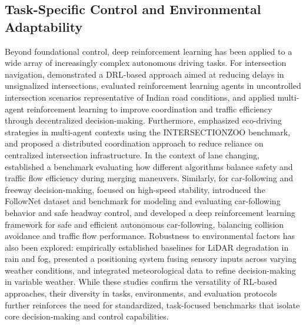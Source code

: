 \documentclass[sn-mathphys,Numbered]{sn-jnl}
\begin{document}
\subsection{Task-Specific Control and Environmental Adaptability}
Beyond foundational control, deep reinforcement learning has been applied to a wide array of increasingly complex autonomous driving tasks. For intersection navigation, \citet{benelallid2023intersection} demonstrated a DRL-based approach aimed at reducing delays in unsignalized intersections, \citet{shankar2025deep} evaluated reinforcement learning agents in uncontrolled intersection scenarios representative of Indian road conditions, and \citet{Spatharis02012024} applied multi-agent reinforcement learning to improve coordination and traffic efficiency through decentralized decision-making. Furthermore, \citet{jayawardana2023} emphasized eco-driving strategies in multi-agent contexts using the INTERSECTIONZOO benchmark, and \citet{cederle2024distributed} proposed a distributed coordination approach to reduce reliance on centralized intersection infrastructure. In the context of lane changing, \citet{wang2024benchmarking} established a benchmark evaluating how different algorithms balance safety and traffic flow efficiency during merging maneuvers. Similarly, for car-following and freeway decision-making, \citet{liu2024comparative} focused on high-speed stability, \citet{chen2023follownet} introduced the FollowNet dataset and benchmark for modeling and evaluating car-following behavior and safe headway control, and \citet{Marin04122025} developed a deep reinforcement learning framework for safe and efficient autonomous car-following, balancing collision avoidance and traffic flow performance. Robustness to environmental factors has also been explored: \citet{kim2023empirical} empirically established baselines for LiDAR degradation in rain and fog, \citet{almalioglu2022} presented a positioning system fusing sensory inputs across varying weather conditions, and \citet{BenElallid02112025} integrated meteorological data to refine decision-making in variable weather. While these studies confirm the versatility of RL-based approaches, their diversity in tasks, environments, and evaluation protocols further reinforces the need for standardized, task-focused benchmarks that isolate core decision-making and control capabilities.
\end{document}
